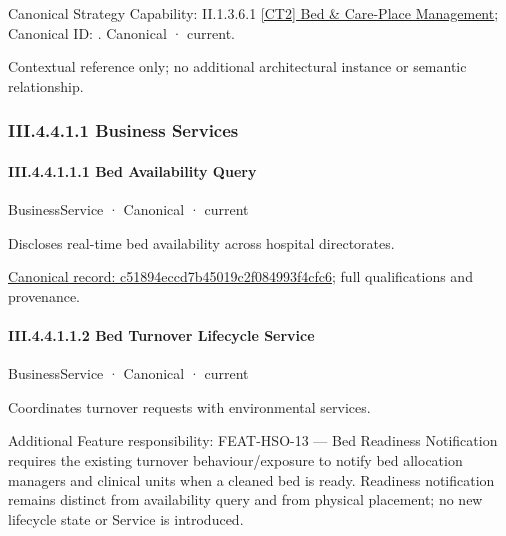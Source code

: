 {\small Canonical Strategy Capability: II.1.3.6.1 \hyperref[element:f117ccec0bfa4f738e6ddb646b3534a2]{[CT2] Bed \& Care-Place Management}; Canonical ID: \texttt{}. Canonical · current.}\par
Contextual reference only; no additional architectural instance or semantic relationship.\par
\subsubsection*{III.4.4.1.1 Business Services}
\label{navigation:III.4.4.1.1}

\paragraph*{III.4.4.1.1.1 Bed Availability Query}
\label{navigation:III.4.4.1.1.1}

\label{element:c51894eccd7b45019c2f084993f4cfc6}
{\small BusinessService · Canonical · current}\par

Discloses real-time bed availability across hospital directorates.


{\footnotesize \href{../../../../continuum/business/business-service/c51894eccd7b45019c2f084993f4cfc6.md}{Canonical record: c51894eccd7b45019c2f084993f4cfc6}; full qualifications and provenance.}\par
\paragraph*{III.4.4.1.1.2 Bed Turnover Lifecycle Service}
\label{navigation:III.4.4.1.1.2}

\label{element:f0ab3847b1bf41869a85b1a5ef217429}
{\small BusinessService · Canonical · current}\par

Coordinates turnover requests with environmental services.



Additional Feature responsibility: FEAT-HSO-13 — Bed Readiness Notification requires the existing turnover behaviour/exposure to notify bed allocation managers and clinical units when a cleaned bed is ready. Readiness notification remains distinct from availability query and from physical placement; no new lifecycle state or Service is introduced.


